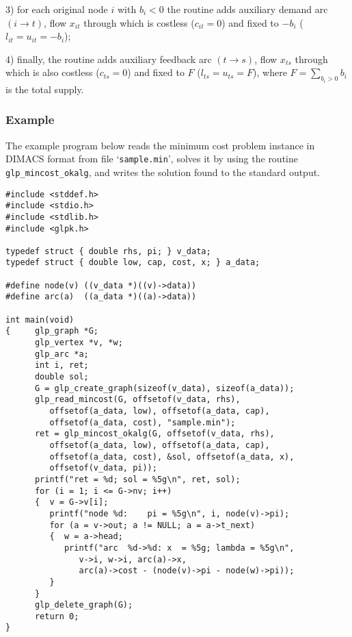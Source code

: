 \documentclass[dvipdfm,11pt]{report}
\begin{document}
3) for each original node $i$ with $b_i<0$ the routine adds auxiliary
demand arc $(i\rightarrow t)$, flow $x_{it}$ through which is costless
($c_{it}=0$) and fixed to $-b_i$ ($l_{it}=u_{it}=-b_i$);

4) finally, the routine adds auxiliary feedback arc $(t\rightarrow s)$,
flow $x_{ts}$ through which is also costless ($c_{ts}=0$) and fixed to
$F$ ($l_{ts}=u_{ts}=F$), where $\displaystyle F=\sum_{b_i>0}b_i$ is the
total supply.

\subsubsection*{Example}

The example program below reads the minimum cost problem instance in
DIMACS format from file `\verb|sample.min|', solves it by using the
routine \verb|glp_mincost_okalg|, and writes the solution found to the
standard output.

\begin{footnotesize}
\begin{verbatim}
#include <stddef.h>
#include <stdio.h>
#include <stdlib.h>
#include <glpk.h>

typedef struct { double rhs, pi; } v_data;
typedef struct { double low, cap, cost, x; } a_data;

#define node(v) ((v_data *)((v)->data))
#define arc(a)  ((a_data *)((a)->data))

int main(void)
{     glp_graph *G;
      glp_vertex *v, *w;
      glp_arc *a;
      int i, ret;
      double sol;
      G = glp_create_graph(sizeof(v_data), sizeof(a_data));
      glp_read_mincost(G, offsetof(v_data, rhs),
         offsetof(a_data, low), offsetof(a_data, cap),
         offsetof(a_data, cost), "sample.min");
      ret = glp_mincost_okalg(G, offsetof(v_data, rhs),
         offsetof(a_data, low), offsetof(a_data, cap),
         offsetof(a_data, cost), &sol, offsetof(a_data, x),
         offsetof(v_data, pi));
      printf("ret = %d; sol = %5g\n", ret, sol);
      for (i = 1; i <= G->nv; i++)
      {  v = G->v[i];
         printf("node %d:    pi = %5g\n", i, node(v)->pi);
         for (a = v->out; a != NULL; a = a->t_next)
         {  w = a->head;
            printf("arc  %d->%d: x  = %5g; lambda = %5g\n",
               v->i, w->i, arc(a)->x,
               arc(a)->cost - (node(v)->pi - node(w)->pi));
         }
      }
      glp_delete_graph(G);
      return 0;
}
\end{verbatim}
\end{footnotesize}
\end{document}
